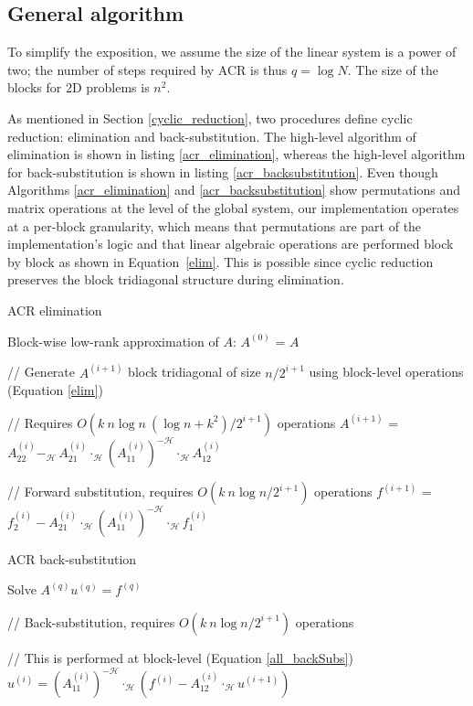 \documentclass[]{elsarticle}
\begin{document}
\subsection{General algorithm}

To simplify the exposition, we assume the size of the linear system is a power of two; the number of steps required by ACR is thus $q=\log N$. The size of the blocks for 2D problems is $n^2$.

As mentioned in Section \ref{cyclic_reduction}, two procedures define cyclic reduction: elimination and back-substitution.
The high-level algorithm of elimination is shown in listing \ref{acr_elimination}, whereas the high-level algorithm for back-substitution is shown in listing \ref{acr_backsubstitution}. Even though Algorithms \ref{acr_elimination} and \ref{acr_backsubstitution} show permutations and matrix operations at the level of the global system, our implementation operates at a per-block granularity, which means that permutations are part of the implementation's logic and that linear algebraic operations are performed block by block as shown in Equation~\ref{elim}. This is possible since cyclic reduction preserves the block tridiagonal structure during elimination.

\begin{algorithm}[H]
\caption{ACR elimination}
\begin{algorithmic}[1]
\item Block-wise low-rank approximation of $A$: $A^{(0)}$ = $A$
\item // Generate $A^{(i+1)}$ block tridiagonal of size $n/2^{i+1}$ using block-level operations (Equation \ref{elim})
\item // Requires $O(k~n \log n~(\log n + k^2) / 2^{i+1})$ operations
\STATE $A^{(i+1)}$ = $A_{22}^{(i)} -_{\mathcal{H}} \, A_{21}^{(i)} \cdot_{\mathcal{H}} (A_{11}^{(i)})^{-\mathcal{H}} \cdot_{\mathcal{H}} A_{12}^{(i)}$
\item // Forward substitution, requires $O(k~n \log n/ 2^{i+1})$ operations
\STATE $f^{(i+1)}$ = $f^{(i)}_{2} - A_{21}^{(i)} \cdot_{\mathcal{H}} (A_{11}^{(i)})^{-\mathcal{H}} \cdot_{\mathcal{H}} f^{(i)}_{1}$
\ENDFOR
\end{algorithmic}
\label{acr_elimination}
\end{algorithm}

\begin{algorithm}[H]
\caption{ACR back-substitution}
\begin{algorithmic}[1]
\STATE Solve $A^{(q)} u^{(q)} = f^{(q)}$
\item // Back-substitution, requires $O(k~n \log n/ 2^{i+1})$ operations
\item // This is performed at block-level (Equation \ref{all_backSubs})
\STATE $u^{(i)} = (A_{11}^{(i)})^{-\mathcal{H}} \cdot_{\mathcal{H}} ( f^{(i)} - A_{12}^{(i)} \cdot_{\mathcal{H}} u^{(i+1)})$
\ENDFOR
\end{algorithmic}
\label{acr_backsubstitution}
\end{algorithm}
\end{document}

